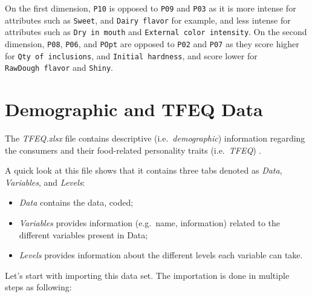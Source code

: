 \documentclass[
]{book}
\providecommand{\tightlist}{%
  \setlength{\itemsep}{0pt}\setlength{\parskip}{0pt}}
\begin{document}
On the first dimension, \texttt{P10} is opposed to \texttt{P09} and \texttt{P03} as it is more intense for attributes such as \texttt{Sweet}, and \texttt{Dairy\ flavor} for example, and less intense for attributes such as \texttt{Dry\ in\ mouth} and \texttt{External\ color\ intensity}. On the second dimension, \texttt{P08}, \texttt{P06}, and \texttt{POpt} are opposed to \texttt{P02} and \texttt{P07} as they score higher for \texttt{Qty\ of\ inclusions}, and \texttt{Initial\ hardness}, and score lower for \texttt{RawDough\ flavor} and \texttt{Shiny}.

\hypertarget{demographic-and-tfeq-data}{%
\section{Demographic and TFEQ Data}\label{demographic-and-tfeq-data}}

The \emph{TFEQ.xlsx} file contains descriptive (i.e.~\emph{demographic}) information regarding the consumers and their food-related personality traits (i.e.~\emph{TFEQ}) .

A quick look at this file shows that it contains three tabs denoted as \emph{Data}, \emph{Variables}, and \emph{Levels}:

\begin{itemize}
\tightlist
\item
  \emph{Data} contains the data, coded;
\item
  \emph{Variables} provides information (e.g.~name, information) related to the different variables present in Data;
\item
  \emph{Levels} provides information about the different levels each variable can take.
\end{itemize}

Let's start with importing this data set. The importation is done in multiple steps as following:
\end{document}
